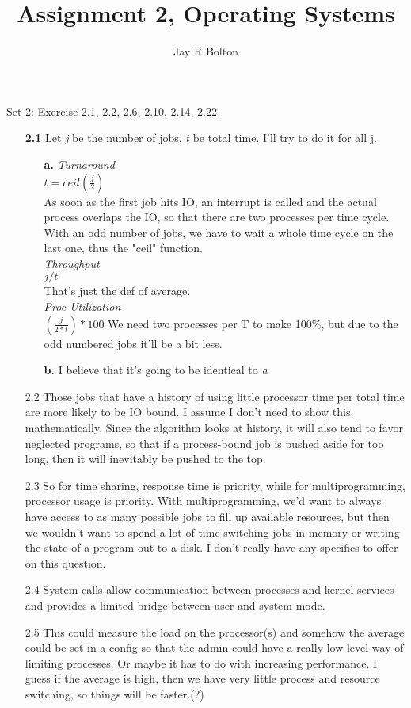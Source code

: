 \documentclass{article}
\title{Assignment 2, Operating Systems}
\author{Jay R Bolton}
\begin{document}
\maketitle

Set 2: Exercise 2.1, 2.2, 2.6, 2.10, 2.14, 2.22

\begin{enumerate}

\item[\textbf{2.1}]
 Let \emph{j} be the number of jobs, \emph{t} be total time. I'll try to do it
 for all j.
 \begin{enumerate}
  \item[\textbf{a.}]
   \emph{Turnaround}\\
   $t = ceil(\frac{j}{2})$\\
   As soon as the first job hits IO, an interrupt is called and the actual
   process overlaps the IO, so that there are two processes per time cycle.
   With an odd number of jobs, we have to wait a whole time cycle on the last
   one, thus the "ceil" function.\\
   \emph{Throughput}\\
   $j/t$\\
   That's just the def of average.\\
   \emph{Proc Utilization}\\
   $(\frac{j}{2*t})*100$
   We need two processes per T to make 100\%, but due to the odd numbered jobs
   it'll be a bit less.
  \item[\textbf{b.}]
   I believe that it's going to be identical to \emph{a}
 \end{enumerate}

\item[2.2]
 Those jobs that have a history of using little processor time per total time
 are more likely to be IO bound. I assume I don't need to show this
 mathematically. Since the algorithm looks at history, it will also tend to
 favor neglected programs, so that if a process-bound job is pushed aside for
 too long, then it will inevitably be pushed to the top.

\item[2.3]
 So for time sharing, response time is priority, while for multiprogramming,
 processor usage is priority. With multiprogramming, we'd want to always have
 access to as many possible jobs to fill up available resources, but then we
 wouldn't want to spend a lot of time switching jobs in memory or writing the
 state of a program out to a disk. I don't really have any specifics to offer
 on this question.


\item[2.4]
 System calls allow communication between processes and kernel services and
 provides a limited bridge between user and system mode.

\item[2.5]
 This could measure the load on the processor(s) and somehow the average could
 be set in a config so that the admin could have a really low level way of
 limiting processes. Or maybe it has to do with increasing performance. I guess
 if the average is high, then we have very little process and resource
 switching, so things will be faster.(?)

\end{enumerate}
\end{document}

